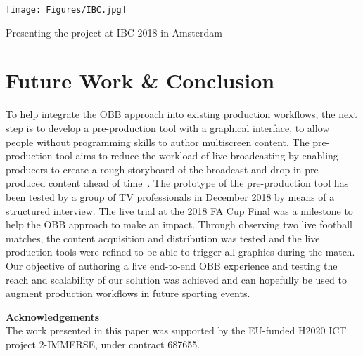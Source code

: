 \documentclass[sigchi-a]{acmart}
\begin{document}
\begin{marginfigure}
    \vspace{3pc}
    \hspace*{-1cm}
    \texttt{[image: Figures/IBC.jpg]}
    \caption{Presenting the project at IBC 2018 in Amsterdam}
    \label{fig:ibc}
\end{marginfigure}

\section{Future Work \& Conclusion}

To help integrate the OBB approach into existing production workflows, the next
step is to develop a pre-production tool with a graphical interface, to allow
people without programming skills to author multiscreen content. The pre-production
tool aims to reduce the workload of live broadcasting by enabling producers to
create a rough storyboard of the broadcast and drop in pre-produced content ahead
of time~\cite{Li:2018_TVX}. The prototype of the pre-production tool has been
tested by a group of TV professionals in December 2018 by means of a structured interview. The live trial at
the 2018 FA Cup Final was a milestone to help the OBB approach to make an impact.
Through observing two live football matches, the content acquisition and distribution
was tested and the live production tools were refined to be able to trigger all graphics during the match.
Our objective of authoring a live end-to-end OBB experience and testing the
reach and scalability of our solution was achieved and can hopefully be used to
augment production workflows in future sporting events.

\begin{sidebar}
    \vspace{2pc}
    \noindent\textbf{Acknowledgements}\\
    \noindent The work presented in this paper was supported by the EU-funded
    H2020 ICT project 2-IMMERSE, under contract 687655.
\end{sidebar}



\end{document}

